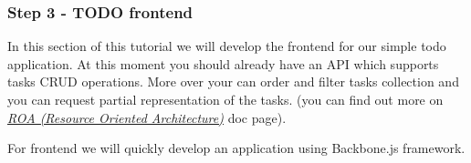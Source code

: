 \documentclass[letterpaper,10pt,english]{sphinxmanual}
\begin{document}
\subsubsection{Step 3 - TODO frontend}
\label{how_to/todo/step_3_create_frontend:step-3-todo-frontend}\label{how_to/todo/step_3_create_frontend::doc}
In this section of this tutorial we will develop the frontend for our simple todo application. At this moment you should already
have an API which supports tasks CRUD operations. More over your can order and filter tasks collection and you can request
partial representation of the tasks. (you can find out more on {\hyperref[features/roa::doc]{\emph{ROA (Resource Oriented Architecture)}}} doc page).

For frontend we will quickly develop an application using Backbone.js framework.
\end{document}

